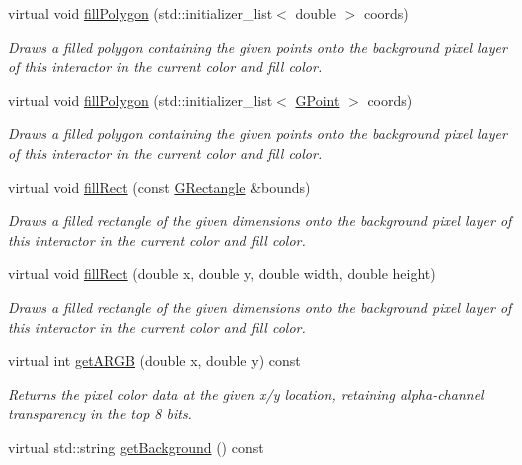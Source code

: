 \begin{DoxyCompactItemize}
virtual void \mbox{\hyperlink{classGDrawingSurface_a15f8c1c4409ef51c1a30a92a195b8f66}{fill\+Polygon}} (std\+::initializer\+\_\+list$<$ double $>$ coords)
\begin{DoxyCompactList}\small\item\em Draws a filled polygon containing the given points onto the background pixel layer of this interactor in the current color and fill color. \end{DoxyCompactList}\item 
virtual void \mbox{\hyperlink{classGDrawingSurface_a31822d59786156ebf1cc3b2f7fb70330}{fill\+Polygon}} (std\+::initializer\+\_\+list$<$ \mbox{\hyperlink{structGPoint}{G\+Point}} $>$ coords)
\begin{DoxyCompactList}\small\item\em Draws a filled polygon containing the given points onto the background pixel layer of this interactor in the current color and fill color. \end{DoxyCompactList}\item 
virtual void \mbox{\hyperlink{classGDrawingSurface_ae6582295003bf2488836b1993dadbad7}{fill\+Rect}} (const \mbox{\hyperlink{structGRectangle}{G\+Rectangle}} \&bounds)
\begin{DoxyCompactList}\small\item\em Draws a filled rectangle of the given dimensions onto the background pixel layer of this interactor in the current color and fill color. \end{DoxyCompactList}\item 
virtual void \mbox{\hyperlink{classGDrawingSurface_aac3ae7d3aee950de78eca0e108352254}{fill\+Rect}} (double x, double y, double width, double height)
\begin{DoxyCompactList}\small\item\em Draws a filled rectangle of the given dimensions onto the background pixel layer of this interactor in the current color and fill color. \end{DoxyCompactList}\item 
virtual int \mbox{\hyperlink{classGDrawingSurface_ae394d39f20476570e083918d991c25bd}{get\+A\+R\+GB}} (double x, double y) const
\begin{DoxyCompactList}\small\item\em Returns the pixel color data at the given x/y location, retaining alpha-\/channel transparency in the top 8 bits. \end{DoxyCompactList}\item 
virtual std\+::string \mbox{\hyperlink{classGDrawingSurface_a808e22cc1fdfbecf71ed8c64ef4600e0}{get\+Background}} () const

\end{DoxyCompactItemize}
